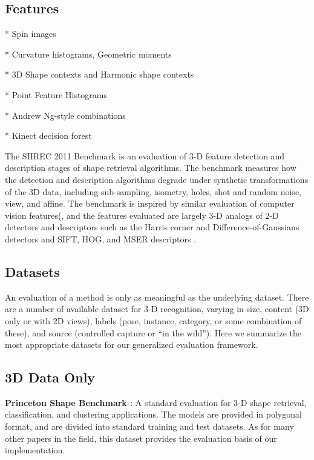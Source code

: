 \subsection{Features}

* Spin images \cite{Johnson1999}

* Curvature histograms, Geometric moments

* 3D Shape contexts and Harmonic shape contexts \cite{Frome2004}

* Point Feature Histograms \cite{Rusu2009}

* Andrew Ng-style combinations \cite{Gould2008,Coates2010}

* Kinect decision forest \cite{Shotton2011}

The SHREC 2011 Benchmark \cite{Boyer2011} is an evaluation of 3-D feature detection and description stages of shape retrieval algorithms.
The benchmark measures how the detection and description algorithms degrade under synthetic transformations of the 3D data, including sub-sampling, isometry, holes, shot and random noise, view, and affine.
The benchmark is inspired by similar evaluation of computer vision features(\cite{Mikolajczyk2004,Mikolajczyk2005}, and the features evaluated are largely 3-D analogs of 2-D detectors and descriptors such as the Harris corner and Difference-of-Gaussians \cite{Harris1988,Lowe2004} detectors and SIFT, HOG, and MSER descriptors \cite{Lowe2004,Dalal2005,Matas2004}.

\subsection{Datasets}

An evaluation of a method is only as meaningful as the underlying dataset.
There are a number of available dataset for 3-D recognition, varying in size, content (3D only or with 2D views), labels (pose, instance, category, or some combination of these), and source (controlled capture or ``in the wild'').
Here we summarize the most appropriate datasets for our generalized evaluation framework.

\subsection{3D Data Only}
{\bf Princeton Shape Benchmark \cite{Shilane2004}}:
A standard evaluation for 3-D shape retrieval, classification, and clustering applications.
The models are provided in polygonal format, and are divided into standard training and test datasets.
As for many other papers in the field, this dataset provides the evaluation basis of our implementation.

